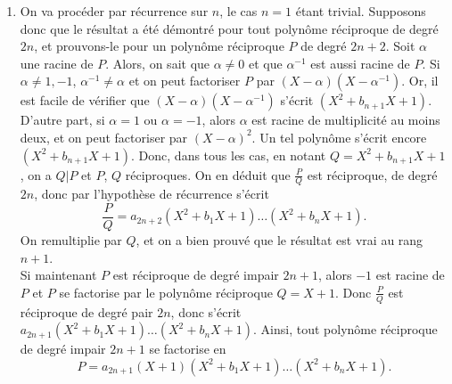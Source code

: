 \documentclass[11pt,a4paper]{article}
\begin{document}
\begin{corrige}
\begin{enumerate}
			
			\item  On va procéder par récurrence sur $n$, le cas $n=1$ étant trivial. Supposons donc que le résultat a été démontré pour tout polynôme réciproque
			de degré $2n$, et prouvons-le pour un polynôme réciproque $P$ de degré $2n+2$. Soit $\alpha$ une racine de $P$. Alors, on sait que 
			$\alpha\neq 0$ et que $\alpha^{-1}$ est aussi racine de $P$. Si $\alpha\neq 1,-1$, $\alpha^{-1}\neq \alpha$ et on peut factoriser
			$P$ par $(X-\alpha)(X-\alpha^{-1})$. Or, il est facile de vérifier que $(X-\alpha)(X-\alpha^{-1})$ s'écrit $(X^2+b_{n+1}X+1)$. D'autre part,
			si $\alpha=1$ ou $\alpha=-1$, alors $\alpha$ est racine de multiplicité au moins deux, et on peut factoriser par $(X-\alpha)^2$. Un tel 
			polynôme s'écrit encore $(X^2+b_{n+1}X+1)$. Donc, dans tous les cas, en notant $Q=X^2+b_{n+1}X+1$, on a $Q|P$ et
			$P$, $Q$ réciproques. On en déduit que $\frac PQ$ est réciproque, de degré $2n$, donc par l'hypothèse de récurrence s'écrit
			$$\frac PQ=a_{2n+2}(X^2+b_1X+1)\dots(X^2+b_n X+1).$$
			On remultiplie par $Q$, et on a bien prouvé que le résultat est vrai au rang $n+1$.\\
			
			Si maintenant $P$ est réciproque de degré impair $2n+1$, alors $-1$ est racine de $P$ et $P$ se factorise par le polynôme réciproque $Q=X+1$. 
			Donc $\frac PQ$ est réciproque de degré pair $2n$, donc s'écrit $a_{2n+1}(X^2+b_1X+1)\dots(X^2+b_n X+1).$
			Ainsi, tout polynôme réciproque de degré impair $2n+1$ se factorise en 
			$$P=a_{2n+1}(X+1)(X^2+b_1X+1)\dots(X^2+b_n X+1).$$
			
		\end{enumerate}
	\end{corrige}
	
\end{document}
